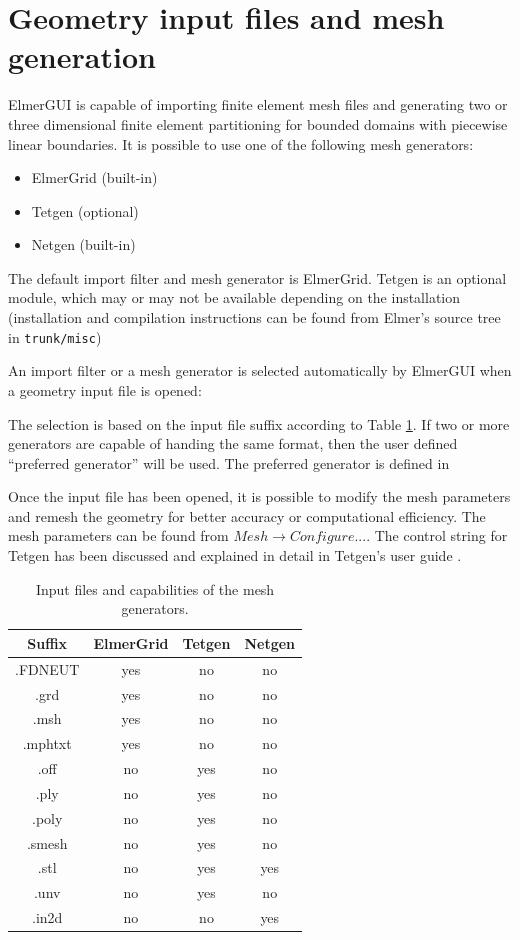 \section{Geometry input files and mesh generation}

ElmerGUI is capable of importing finite element mesh files and generating two or three
dimensional finite element partitioning for bounded domains with piecewise linear
boundaries. It is possible to use one of the following mesh generators:
\begin{itemize}
 \item ElmerGrid (built-in)
 \item Tetgen (optional)
 \item Netgen (built-in)
\end{itemize}
The default import filter and mesh generator is ElmerGrid. Tetgen is an optional
module, which may or may not be available depending on the installation (installation and
compilation instructions can be found from Elmer's source tree in {\tt trunk/misc})

An import filter or a mesh generator is selected automatically by ElmerGUI when a geometry
input file is opened:


The selection is based on the input file suffix according to Table \ref{table:inputfiles}. If two or more
generators are capable of handing the same format, then the user defined ``preferred
generator'' will be used. The preferred generator is defined in


Once the input file has been opened, it is possible to modify the mesh parameters
and remesh the geometry for better accuracy or computational efficiency. The mesh parameters
can be found from $Mesh \rightarrow Configure...$. The control string for Tetgen
has been discussed and explained in detail in Tetgen's user guide \cite{TetgenHome}.

\begin{table}
	\caption{Input files and capabilities of the mesh generators.}
	\label{table:inputfiles}
	\begin{center}
		\begin{tabular}{|c|c|c|c|}
		\hline
		 Suffix & ElmerGrid & Tetgen & Netgen \\
		\hline 
		.FDNEUT & yes & no & no \\
		.grd  & yes & no & no \\
		.msh & yes & no & no \\
		.mphtxt & yes & no & no \\
		.off & no & yes & no \\
		.ply & no & yes & no \\
		.poly & no & yes & no \\
		.smesh & no & yes & no \\
		.stl  & no & yes & yes \\
		.unv & no & yes & no \\
		.in2d & no & no & yes \\
		\hline
		\end{tabular}
	\end{center}
\end{table}

